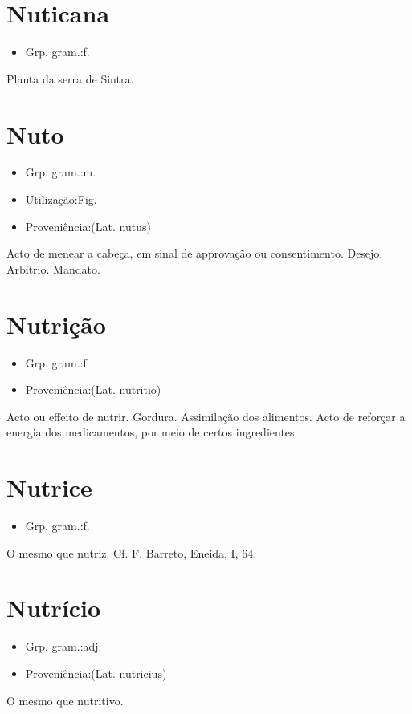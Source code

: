 \section{Nuticana}
\begin{itemize}
\item {Grp. gram.:f.}
\end{itemize}
Planta da serra de Sintra.
\section{Nuto}
\begin{itemize}
\item {Grp. gram.:m.}
\end{itemize}
\begin{itemize}
\item {Utilização:Fig.}
\end{itemize}
\begin{itemize}
\item {Proveniência:(Lat. \textunderscore nutus\textunderscore )}
\end{itemize}
Acto de menear a cabeça, em sinal de approvação ou consentimento.
Desejo.
Arbitrio.
Mandato.
\section{Nutrição}
\begin{itemize}
\item {Grp. gram.:f.}
\end{itemize}
\begin{itemize}
\item {Proveniência:(Lat. \textunderscore nutritio\textunderscore )}
\end{itemize}
Acto ou effeito de nutrir.
Gordura.
Assimilação dos alimentos.
Acto de reforçar a energia dos medicamentos, por meio de certos ingredientes.
\section{Nutrice}
\begin{itemize}
\item {Grp. gram.:f.}
\end{itemize}
O mesmo que \textunderscore nutriz\textunderscore . Cf. F. Barreto, \textunderscore Eneida\textunderscore , I, 64.
\section{Nutrício}
\begin{itemize}
\item {Grp. gram.:adj.}
\end{itemize}
\begin{itemize}
\item {Proveniência:(Lat. \textunderscore nutricius\textunderscore )}
\end{itemize}
O mesmo que \textunderscore nutritivo\textunderscore .
